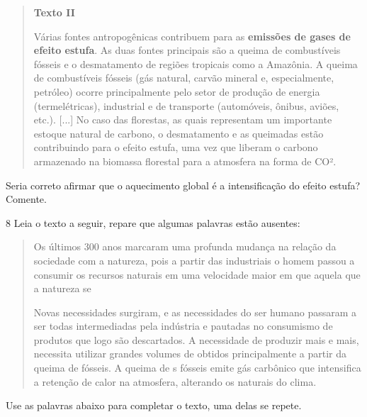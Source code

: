 \begin{quote}
\textbf{Texto II}

Várias fontes antropogênicas contribuem para as \textbf{emissões
de gases de efeito estufa}. As duas fontes principais são a queima de
combustíveis fósseis e o desmatamento de regiões tropicais como a
Amazônia. A queima de combustíveis fósseis (gás natural, carvão mineral
e, especialmente, petróleo) ocorre principalmente pelo setor de produção
de energia (termelétricas), industrial e de transporte (automóveis,
ônibus, aviões, etc.). {[}...{]} No caso das florestas, as quais
representam um importante estoque natural de carbono, o desmatamento e
as queimadas estão contribuindo para o efeito estufa, uma vez que
liberam o carbono armazenado na biomassa florestal para a atmosfera na
forma de CO².

\end{quote}

Seria correto afirmar que o aquecimento global é a intensificação do
efeito estufa? Comente.



\num{8} Leia o texto a seguir, repare que algumas palavras estão ausentes:

\begin{quote}
Os últimos 300 anos marcaram uma profunda mudança na relação da
sociedade com a natureza, pois a partir das 
industriais o homem passou a consumir os recursos naturais em uma
velocidade maior em que aquela que a natureza se 

Novas necessidades surgiram, e as necessidades do ser humano
passaram a ser todas intermediadas pela indústria e pautadas no
consumismo de produtos que logo são descartados. A necessidade de
produzir mais e mais, necessita utilizar grandes volumes de
 obtidos principalmente a partir da queima de
 fósseis. A queima de s fósseis
emite gás carbônico que intensifica a retenção de calor na atmosfera,
alterando os  naturais do clima.
\end{quote}

Use as palavras abaixo para completar o texto, uma delas se repete.

